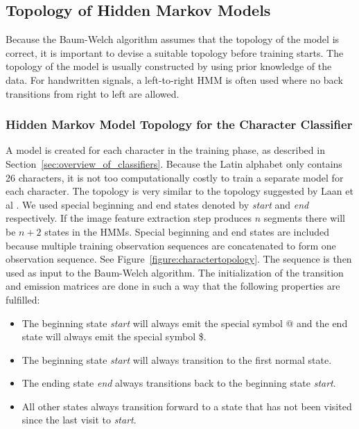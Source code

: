 
\subsection{Topology of Hidden Markov Models}

Because the Baum-Welch algorithm assumes that the topology of the model is correct, it is important to devise a suitable topology before training starts. 
The topology of the model is usually constructed by using prior knowledge of the data. 
For handwritten signals, a left-to-right HMM is often used where no back transitions from right to left are allowed. \cite{Suen}

\subsubsection{Hidden Markov Model Topology for the Character Classifier}

A model is created for each character in the training phase, as described in Section~\ref{sec:overview_of_classifiers}.
Because the Latin alphabet only contains 26 characters, it is not too computationally costly to train a separate model for each character.
The topology is very similar to the topology suggested by Laan et al \cite{Laan}. 
We used special beginning and end states denoted by \textit{start} and \textit{end} respectively.
If the image feature extraction step produces $n$ segments there will be $n + 2$ states in the HMMs.
Special beginning and end states are included because multiple training observation sequences are concatenated to form one observation sequence.
See Figure~\ref{figure:charactertopology}.
The sequence is then used as input to the Baum-Welch algorithm.
The initialization of the transition and emission matrices are done in such a way that the following properties are fulfilled:

\begin{itemize}
 \item The beginning state \textit{start} will always emit the special symbol @ and the end state will always emit the special symbol \$.
 \item The  beginning state \textit{start} will always transition to the first normal state.
 \item The ending state \textit{end} always transitions back to the beginning state \textit{start}.
 \item All other states always transition forward to a state that has not been visited since the last visit to \textit{start}.
\end{itemize}

